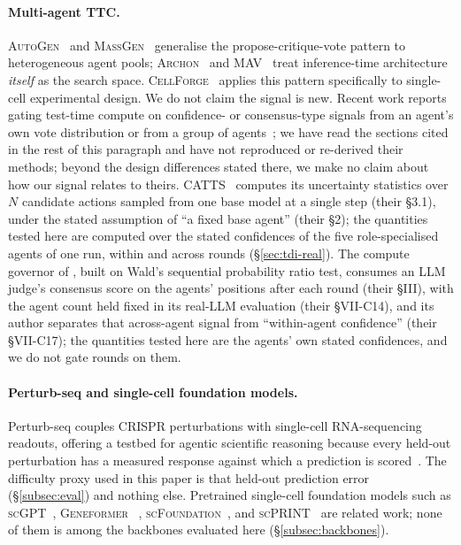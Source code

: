 \documentclass[10pt,a4paper]{article}
\begin{document}
\paragraph{Multi-agent TTC.} \textsc{AutoGen}~\citep{wu2023autogen} and
\textsc{MassGen}~\citep{massgen2025github} generalise the propose-critique-vote
pattern to heterogeneous agent pools; \textsc{Archon}~\citep{saad2024archon} and
\textsc{MAV}~\citep{lifshitz2025mav} treat inference-time architecture
\emph{itself} as the search space. \textsc{CellForge}~\citep{chen2025cellforge}
applies this pattern specifically to single-cell experimental design. We do
not claim the signal is new. Recent work reports gating test-time
compute on confidence- or consensus-type signals from an agent's own vote
distribution or from a group of agents~\citep{lee2026catts,morandi2026sprt};
we have read the sections cited in the rest of this paragraph and have not reproduced or
re-derived their methods; beyond the design differences stated there, we
make no claim about how our signal relates to theirs. \textsc{CATTS}~\citep{lee2026catts} computes its uncertainty statistics over
$N$ candidate actions sampled from one base model at a single step (their
\S3.1), under the stated assumption of ``a fixed base agent'' (their \S2);
the quantities tested here are computed over the stated confidences of the
five role-specialised agents of one run, within and across rounds
(\S\ref{sec:tdi-real}).
The compute governor of \citet{morandi2026sprt}, built on Wald's sequential
probability ratio test, consumes an LLM judge's
consensus score on the agents' positions after each round (their \S III),
with the agent count held fixed in its real-LLM evaluation (their
\S VII-C14), and its author separates that across-agent signal from
``within-agent confidence'' (their \S VII-C17); the quantities tested here
are the agents' own stated confidences, and we do not gate rounds on them.

\paragraph{Perturb-seq and single-cell foundation models.} Perturb-seq
couples CRISPR perturbations with single-cell RNA-sequencing readouts,
offering a testbed for agentic scientific reasoning because every held-out
perturbation has a measured response against which a prediction is
scored~\citep{norman2019perturbseq,adamson2016perturbseq,
replogle2022perturbseq}. The difficulty proxy used in this paper is that held-out
prediction error (\S\ref{subsec:eval}) and nothing else. Pretrained single-cell foundation models such as
\textsc{scGPT}~\citep{cui2024scgpt}, \textsc{Geneformer}%
~\citep{theodoris2023geneformer}, \textsc{scFoundation}~\citep{hao2024scfoundation},
and \textsc{scPRINT}~\citep{kalfon2025scprint} are related work; none of them
is among the backbones evaluated here (\S\ref{subsec:backbones}).
\end{document}
